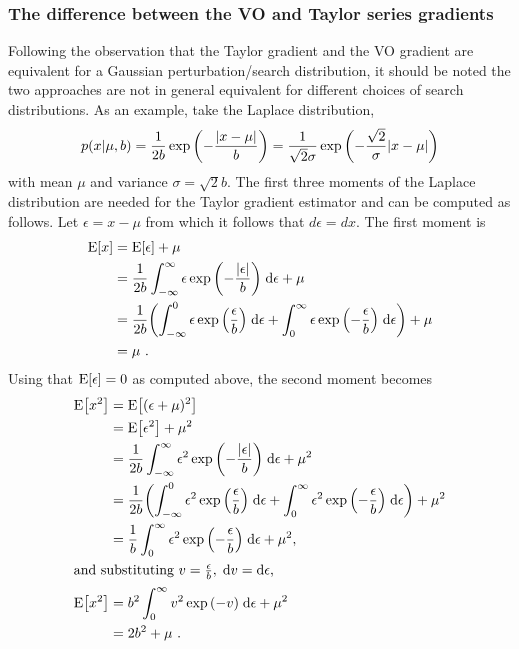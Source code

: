 \subsubsection{The difference between the VO and Taylor series gradients}
Following the observation that the Taylor gradient and the \gls{VO} gradient are equivalent for a Gaussian perturbation/search distribution, it should be noted the two approaches are not in general equivalent for different choices of search distributions. As an example, take the Laplace distribution,
\begin{equation}
    p(x|\mu,b) = \frac{1}{2b}\exp{\left(-\frac{{\left\lvert x-\mu\right\rvert}}{b}\right)} = \frac{1}{\sqrt{2}\sigma}\exp{\left(-\frac{\sqrt{2}}{\sigma}{\left\lvert x-\mu\right\rvert}\right)}
\end{equation}
with mean $\mu$ and variance $\sigma=\sqrt{2}b$. The first three moments of the Laplace distribution are needed for the Taylor gradient estimator and can be computed as follows. Let $\epsilon = x-\mu$ from which it follows that $d\epsilon = dx$. The first moment is
\begin{align}
    \text{E}{\left[x\right]}
    &= \text{E}{\left[\epsilon\right]}+\mu\nonumber\\
    &= \frac{1}{2b}\int_{-\infty}^{\infty} \epsilon \exp{\left(-\frac{{\left\lvert\epsilon\right\rvert}}{b}\right)}\;\text{d}\epsilon + \mu\nonumber\\
    &= \frac{1}{2b}{\left(\int_{-\infty}^{0} \epsilon \exp{\left(\frac{\epsilon}{b}\right)}\;\text{d}\epsilon + \int_{0}^{\infty} \epsilon \exp{\left(-\frac{\epsilon}{b}\right)}\;\text{d}\epsilon\right)} + \mu\nonumber\\
    &= \mu \ .
\end{align}
Using that $\text{E}{\left[\epsilon\right]}=0$ as computed above, the second moment becomes
\begin{align}
    \text{E}{\left[x^2\right]}
    &= \text{E}{\left[(\epsilon+\mu)^2\right]}\nonumber\\
    &= \text{E}{\left[\epsilon^2\right]} + \mu^2\nonumber\\
    &= \frac{1}{2b}\int_{-\infty}^{\infty} \epsilon^2 \exp{\left(-\frac{{\left\lvert\epsilon\right\rvert}}{b}\right)}\;\text{d}\epsilon + \mu^2\nonumber\\
    &= \frac{1}{2b}{\left(\int_{-\infty}^{0} \epsilon^2 \exp{\left(\frac{\epsilon}{b}\right)}\;\text{d}\epsilon + \int_{0}^{\infty} \epsilon^2 \exp{\left(-\frac{\epsilon}{b}\right)}\;\text{d}\epsilon\right)} + \mu^2\nonumber\\
    &= \frac{1}{b}\int_{0}^{\infty} \epsilon^2 \exp{\left(-\frac{\epsilon}{b}\right)}\;\text{d}\epsilon + \mu^2,\nonumber\\
\shortintertext{and substituting $v=\frac{\epsilon}{b},\;\text{d}v = \text{d}\epsilon$,}
    \text{E}{\left[x^2\right]} &= b^2\int_{0}^{\infty} v^2 \exp{\left(-v\right)}\;\text{d}\epsilon + \mu^2\nonumber\\
    &= 2b^2 + \mu \ .
\end{align}
